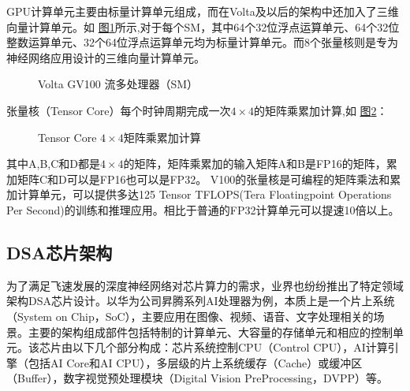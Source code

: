 \documentclass[letterpaper,10pt,english]{sphinxmanual}
\let\sphinxpxdimen\pdfpxdimen\else\newdimen\sphinxpxdimen
\begin{document}
\sphinxAtStartPar
GPU计算单元主要由标量计算单元组成，而在Volta及以后的架构中还加入了三维向量计算单元。如
\hyperref[\detokenize{chapter_accelerator/accelerator_architecture:sm}]{图\ref{\detokenize{chapter_accelerator/accelerator_architecture:sm}}}所示,对于每个SM，其中64个32位浮点运算单元、64个32位整数运算单元、32个64位浮点运算单元均为标量计算单元。而8个张量核则是专为神经网络应用设计的三维向量计算单元。

\begin{figure}[H]
\centering
\capstart

\noindent\sphinxincludegraphics[width=800\sphinxpxdimen]{{SM}.svg}
\caption{Volta GV100 流多处理器（SM）}\label{\detokenize{chapter_accelerator/accelerator_architecture:id9}}\label{\detokenize{chapter_accelerator/accelerator_architecture:sm}}\end{figure}

\sphinxAtStartPar
张量核（Tensor
Core）每个时钟周期完成一次\(4\times4\)的矩阵乘累加计算,如
\hyperref[\detokenize{chapter_accelerator/accelerator_architecture:tensorcore}]{图\ref{\detokenize{chapter_accelerator/accelerator_architecture:tensorcore}}}：

\begin{sphinxVerbatim}[commandchars=\\\{\}]
\end{sphinxVerbatim}

\begin{figure}[H]
\centering
\capstart

\noindent\sphinxincludegraphics[width=800\sphinxpxdimen]{{tensor_core}.svg}
\caption{Tensor Core \(4\times4\)矩阵乘累加计算}\label{\detokenize{chapter_accelerator/accelerator_architecture:id10}}\label{\detokenize{chapter_accelerator/accelerator_architecture:tensorcore}}\end{figure}

\sphinxAtStartPar
其中A,B,C和D都是\(4\times4\)的矩阵，矩阵乘累加的输入矩阵A和B是FP16的矩阵，累加矩阵C和D可以是FP16也可以是FP32。
V100的张量核是可编程的矩阵乘法和累加计算单元，可以提供多达125 Tensor
TFLOPS(Tera Floating\sphinxhyphen{}point Operations Per
Second)的训练和推理应用。相比于普通的FP32计算单元可以提速10倍以上。


\subsection{DSA芯片架构}
\label{\detokenize{chapter_accelerator/accelerator_architecture:dsa}}
\sphinxAtStartPar
为了满足飞速发展的深度神经网络对芯片算力的需求，业界也纷纷推出了特定领域架构DSA芯片设计。以华为公司昇腾系列AI处理器为例，本质上是一个片上系统（System
on
Chip，SoC），主要应用在图像、视频、语音、文字处理相关的场景。主要的架构组成部件包括特制的计算单元、大容量的存储单元和相应的控制单元。该芯片由以下几个部分构成：芯片系统控制CPU（Control
CPU），AI计算引擎（包括AI Core和AI
CPU），多层级的片上系统缓存（Cache）或缓冲区（Buffer），数字视觉预处理模块（Digital
Vision Pre\sphinxhyphen{}Processing，DVPP）等。
\end{document}
